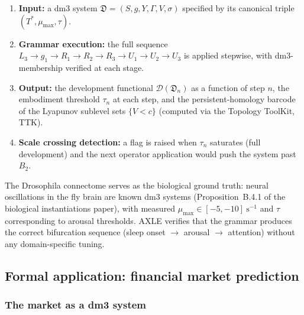\begin{enumerate}[label=(\arabic*)]
  \item \textbf{Input:} a dm3 system $\mathfrak{D} = (S, g, Y,
    \Gamma, V, \sigma)$ specified by its canonical triple
    $(T^*, \mu_{\max}, \tau)$.
  \item \textbf{Grammar execution:} the full sequence
    $L_3 \to g_1 \to R_1 \to R_2 \to R_3 \to U_1 \to U_2
    \to U_3$ is applied stepwise, with dm3-membership verified
    at each stage.
  \item \textbf{Output:} the development functional
    $\mathcal{D}(\mathfrak{D}_n)$ as a function of step $n$,
    the embodiment threshold $\tau_n$ at each step, and the
    persistent-homology barcode of the Lyapunov sublevel sets
    $\{V < c\}$ (computed via the Topology ToolKit, TTK).
  \item \textbf{Scale crossing detection:} a flag is raised when
    $\tau_n$ saturates (full development) and the next operator
    application would push the system past $B_2$.
\end{enumerate}

The Drosophila connectome serves as the biological ground truth:
neural oscillations in the fly brain are known dm3 systems
(Proposition~B.4.1 of the biological instantiations paper), with
measured $\mu_{\max} \in [-5, -10]\ \mathrm{s}^{-1}$ and
$\tau$ corresponding to arousal thresholds. AXLE verifies that
the grammar produces the correct bifurcation sequence
(sleep onset $\to$ arousal $\to$ attention) without any
domain-specific tuning.

\subsection{Formal application: financial market prediction}
\label{subsec:markets}

\subsubsection{The market as a dm3 system}

